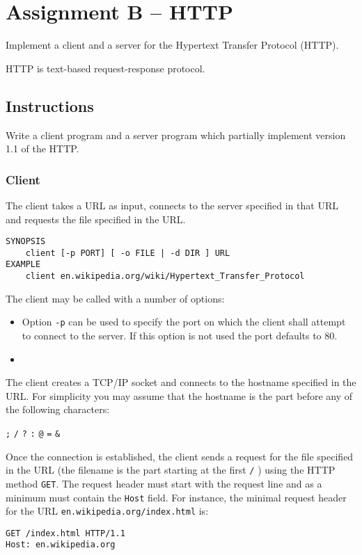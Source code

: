 



\section*{Assignment B -- HTTP}
\label{sec:intro}

Implement a client and a server for the Hypertext Transfer Protocol (HTTP).

HTTP is text-based request-response protocol.

\subsection*{Instructions}

Write a client program and a server program
which partially implement version 1.1 of the HTTP.

\subsubsection*{Client}

The client takes a URL as input,
connects to the server specified in that URL
and requests the file specified in the URL.

\begin{verbatim}
SYNOPSIS
    client [-p PORT] [ -o FILE | -d DIR ] URL
EXAMPLE
    client en.wikipedia.org/wiki/Hypertext_Transfer_Protocol
\end{verbatim}

The client may be called with a number of options:
\begin{itemize}
\item Option \texttt{-p} can be used to specify the port
on which the client shall attempt to connect to the server.
If this option is not used the port defaults to 80.
\item
\end{itemize}

The client creates a TCP/IP socket
and connects to the hostname specified in the URL.
For simplicity you may assume that
the hostname is the part before any of the following characters:

\texttt{;} \texttt{/} \texttt{?} \texttt{:} \texttt{@} \texttt{=} \texttt{\&}

Once the connection is established,
the client sends a request for the file specified in the URL
(the filename is the part starting at the first \texttt{/} )
using the HTTP method \texttt{GET}.
The request header must start with the request line
and as a minimum must contain the \texttt{Host} field.
For instance, the minimal request header for the URL
\texttt{en.wikipedia.org/index.html} is:
\begin{verbatim}
GET /index.html HTTP/1.1
Host: en.wikipedia.org
\end{verbatim}

